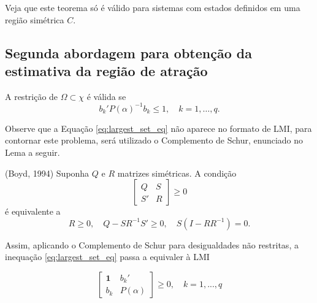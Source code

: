 Veja que este teorema só é válido para sistemas com estados definidos em uma região simétrica $C$.

\subsection{Segunda abordagem para obtenção da estimativa da região de atração}

A restrição de $\Omega\subset\chi$ é válida se \cite{bookboydl:1994}
\begin{equation}\label{eq:largest_set_eq}
b_k'P(\alpha)^{-1}b_k \leq 1,\quad k = 1, \hdots, q.
\end{equation}

Observe que a Equação \ref{eq:largest_set_eq} não aparece no formato de LMI, para contornar este problema, será utilizado o Complemento de Schur, enunciado no Lema a seguir.

\begin{lemma} (Boyd, 1994) \cite{bookboydl:1994} Suponha $Q$ e $R$ matrizes simétricas. A condição
	\begin{equation}\label{eq:schur_compl_nonrestrict_1}
	\begin{bmatrix}
	Q&S\\S'&R
	\end{bmatrix} \geq 0
	\end{equation}
	é equivalente a
	\begin{equation}\label{eq:schur_compl_nonrestrict_2}
	R \geq 0,\quad Q-SR^{-1}S' \geq 0,\quad S(I-RR^{-1}) = 0.
	\end{equation}
	\label{lem:finsler_short_version_nonrestrict_inequalities}
\end{lemma}

Assim, aplicando o Complemento de Schur para desigualdades não restritas, a inequação \ref{eq:largest_set_eq} passa a equivaler à LMI

\begin{equation}\label{eq:largest_set}
\begin{bmatrix}\textbf{1}&b_k'\\b_k&P(\alpha)\end{bmatrix} \geq 0,\quad k = 1, ..., q
\end{equation}

